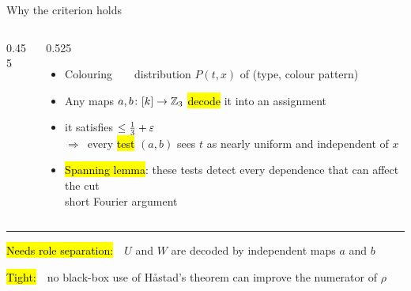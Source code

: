 \begin{frame}{Why the criterion holds}
\vspace{-1mm}
\begin{columns}[c,onlytextwidth]
\begin{column}{0.455\textwidth}

\end{column}
\begin{column}{0.525\textwidth}
\begin{itemize}\setlength{\itemsep}{2mm}
\item Colouring\ \ \pIVto\ \ distribution $P(t,x)$ of (type, colour pattern)
\item Any maps $a,b\colon[k]\to\mathbb{Z}_3$ \hl{decode} it into an assignment
\item {} it satisfies $\le\frac13+\varepsilon$\\
  $\Rightarrow$\ every \hl{test} $(a,b)$ sees $t$ as nearly uniform and independent of $x$
\item \hl{Spanning lemma}: these tests detect every dependence that can affect the cut\\[0.3mm]
  {\small\color{soft}short Fourier argument}\hfill{}
\end{itemize}
\end{column}
\end{columns}
\vspace{2mm}
{\color{acc!35}\rule{\linewidth}{0.5pt}}\par
\vspace{1.2mm}
{\small
\hl{Needs role separation:}\ \ $U$ and $W$ are decoded by independent maps $a$ and $b$\par
\vspace{1mm}
\hl{Tight:}\ \ no black-box use of H\aa stad's theorem can improve the numerator of $\rho$\hfill{}\par}
\end{frame}

